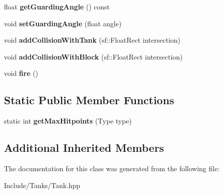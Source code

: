 \begin{DoxyCompactItemize}
\item 
\hypertarget{class_tank_aac61fd8574da62d0e862c5b3ce083a3e}{}float {\bfseries get\+Guarding\+Angle} () const \label{class_tank_aac61fd8574da62d0e862c5b3ce083a3e}

\item 
\hypertarget{class_tank_ad4557e537ce6d8cba6d713e11b18bfbb}{}void {\bfseries set\+Guarding\+Angle} (float angle)\label{class_tank_ad4557e537ce6d8cba6d713e11b18bfbb}

\item 
\hypertarget{class_tank_a41529cc679da94045b88b657b5c3e1e6}{}void {\bfseries add\+Collision\+With\+Tank} (sf\+::\+Float\+Rect intersection)\label{class_tank_a41529cc679da94045b88b657b5c3e1e6}

\item 
\hypertarget{class_tank_a58a1e84bf663aecc38280e19f243eab0}{}void {\bfseries add\+Collision\+With\+Block} (sf\+::\+Float\+Rect intersection)\label{class_tank_a58a1e84bf663aecc38280e19f243eab0}

\item 
\hypertarget{class_tank_aec8a4c16067540f772adacb6b2086c24}{}void {\bfseries fire} ()\label{class_tank_aec8a4c16067540f772adacb6b2086c24}

\end{DoxyCompactItemize}
\subsection*{Static Public Member Functions}
\begin{DoxyCompactItemize}
\item 
\hypertarget{class_tank_a2f556e7e3111622fa9cedf841a814e15}{}static int {\bfseries get\+Max\+Hitpoints} (Type type)\label{class_tank_a2f556e7e3111622fa9cedf841a814e15}

\end{DoxyCompactItemize}
\subsection*{Additional Inherited Members}


The documentation for this class was generated from the following file\+:\begin{DoxyCompactItemize}
\item 
Include/\+Tanks/Tank.\+hpp\end{DoxyCompactItemize}
